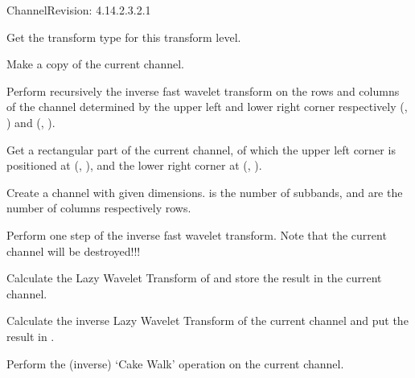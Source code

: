 \begin{manpage}{\libtitle}{Channel}{$ $Revision: 4.14.2.3.2.1 $ $}
\subtitle{Virtual \\ Operations}

    Get the transform type for this transform level.

    Make a copy of the current channel.

    Perform recursively the inverse fast wavelet transform on the rows and
    columns of the channel determined by the upper left and lower right corner
    respectively (, ) and (, ).

    Get a rectangular part of the current channel, of which the upper left
    corner is positioned at (, ), and the lower right corner
    at (, ).


\subtitle{Protected \\ Operations}

    Create a channel with given dimensions.  is the number of
    subbands,  and  are the number of columns
    respectively rows.


\subtitle{Virtual \\ Protected \\ Operations}

    Perform one step of the inverse fast wavelet transform. Note that the
    current channel will be destroyed!!!

    Calculate the Lazy Wavelet Transform of  and store the result
    in the current channel.

    Calculate the inverse Lazy Wavelet Transform of the current channel and
    put the result in .

    Perform the (inverse) `Cake Walk' operation on the current channel.


\end{manpage}
